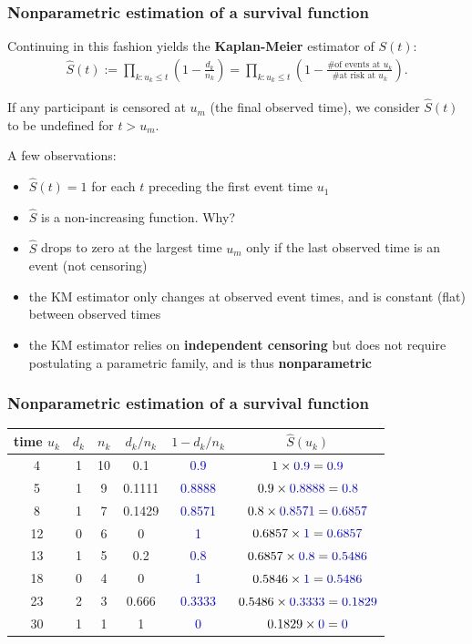 \documentclass[10pt,t]{beamer}
\begin{document}
\begin{frame}
\frametitle{Nonparametric estimation of a survival function}
Continuing in this fashion yields the \textbf{Kaplan-Meier} estimator of $S(t)$: \vspace{-0.3cm}
\begin{align*}
\widehat{S}(t) := \prod_{k: u_k \leq t} \left(1 - \frac{d_k}{n_k} \right) = \prod_{k: u_k \leq t} \left(1 - \frac{\text{\# of events at $u_k$}}{\text{\# at risk at $u_k$}} \right) .
\end{align*}

If any participant is censored at $u_m$ (the final observed time), we consider $\widehat{S}(t)$ to be undefined for $t > u_m$. 

A few observations:
\begin{itemize}
\item $\widehat{S}(t) = 1$ for each $t$ preceding the first event time $u_1$  
\item $\widehat{S}$ is a non-increasing function. Why?  
\item $\widehat{S}$ drops to zero at the largest time $u_m$ only if the last observed time is an event (not censoring)  
\item the KM estimator only changes at observed event times, and is constant (flat) between observed times  
\item the KM estimator relies on \textbf{independent censoring} but does not require postulating a parametric family, and is thus \textbf{nonparametric}
\end{itemize}
\end{frame}

\begin{frame}
\frametitle{Nonparametric estimation of a survival function}

\begin{tabular}{|c|c|c|c|c|c|}
\hline
time $u_k$ & $d_k$ & $n_k$ & $d_k/n_k$ & $1 - d_k/n_k$ & $\widehat{S}(u_k)$ \\
\hline
4 & 1 & 10 & 0.1 & \textcolor{blue}{0.9} & $1 \times \textcolor{blue}{0.9} = \textcolor{blue}{0.9}$\\
5 & 1 & 9 & 0.1111 & \textcolor{blue}{0.8888} & $0.9 \times \textcolor{blue}{0.8888} = \textcolor{blue}{0.8}$ \\
8 & 1 & 7 & 0.1429 & \textcolor{blue}{0.8571} & $0.8 \times \textcolor{blue}{0.8571} = \textcolor{blue}{0.6857}$\\
12 & 0 & 6 & 0 & \textcolor{blue}{1} & $0.6857 \times \textcolor{blue}{1} = \textcolor{blue}{0.6857}$\\
13 & 1 & 5 & 0.2 & \textcolor{blue}{0.8} & $0.6857 \times \textcolor{blue}{0.8} = \textcolor{blue}{0.5486}$\\
18 & 0 & 4 & 0 & \textcolor{blue}{1} & $0.5846 \times \textcolor{blue}{1} = \textcolor{blue}{0.5486}$\\
23 & 2 & 3 & 0.666 & \textcolor{blue}{0.3333} & $0.5486 \times \textcolor{blue}{0.3333} = \textcolor{blue}{0.1829}$\\
30 & 1 & 1 & 1 & \textcolor{blue}{0} & $0.1829 \times \textcolor{blue}{0} = \textcolor{blue}{0}$\\
\hline
\end{tabular}
\end{frame}
\end{document}

